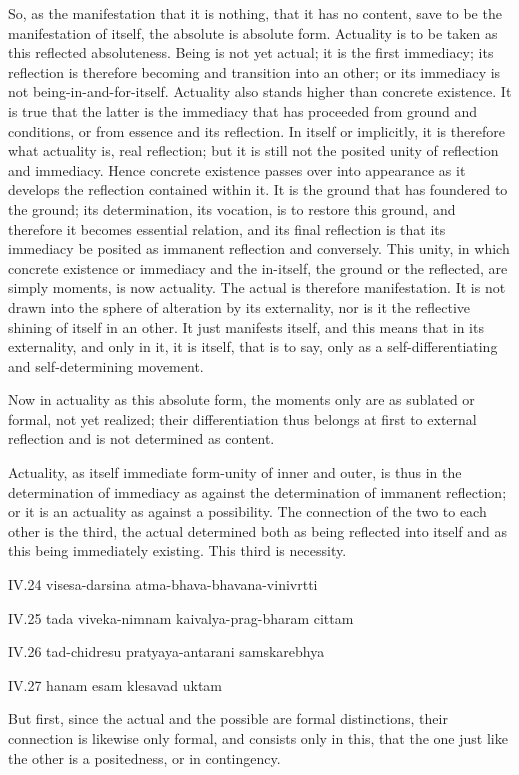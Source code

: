 So, as the manifestation that it is nothing,
that it has no content, save to be
the manifestation of itself,
the absolute is absolute form.
Actuality is to be taken as
this reflected absoluteness.
Being is not yet actual;
it is the first immediacy;
its reflection is therefore becoming
and transition into an other;
or its immediacy is not being-in-and-for-itself.
Actuality also stands higher than concrete existence.
It is true that the latter is the immediacy
that has proceeded from ground and conditions,
or from essence and its reflection.
In itself or implicitly, it is therefore
what actuality is, real reflection;
but it is still not the posited unity of reflection and immediacy.
Hence concrete existence passes over into appearance
as it develops the reflection contained within it.
It is the ground that has foundered to the ground;
its determination, its vocation, is to restore this ground,
and therefore it becomes essential relation,
and its final reflection is that its
immediacy be posited as immanent reflection and conversely.
This unity, in which concrete existence
or immediacy and the in-itself,
the ground or the reflected, are simply moments,
is now actuality.
The actual is therefore manifestation.
It is not drawn into
the sphere of alteration by its externality,
nor is it the reflective shining of itself in an other.
It just manifests itself,
and this means that in its externality,
and only in it, it is itself, that is to say,
only as a self-differentiating and self-determining movement.

Now in actuality as this absolute form,
the moments only are as sublated or formal, not yet realized;
their differentiation thus belongs at first to external reflection
and is not determined as content.

Actuality, as itself immediate form-unity of inner and outer,
is thus in the determination of immediacy
as against the determination of immanent reflection;
or it is an actuality as against a possibility.
The connection of the two to each other is the third,
the actual determined both as being reflected into itself
and as this being immediately existing.
This third is necessity.

IV.24
visesa-darsina atma-bhava-bhavana-vinivrtti

IV.25
tada viveka-nimnam kaivalya-prag-bharam cittam

IV.26
tad-chidresu pratyaya-antarani samskarebhya

IV.27
hanam esam klesavad uktam

But first, since the actual and the possible
are formal distinctions,
their connection is likewise only formal,
and consists only in this,
that the one just like the other
is a positedness, or in contingency.

